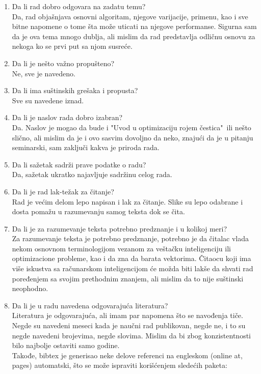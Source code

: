 \documentclass[a4paper]{report}
\begin{document}
\begin{enumerate}
\item Da li rad dobro odgovara na zadatu temu?\\
Da, rad objašnjava osnovni algoritam, njegove varijacije, primenu, kao i sve bitne napomene o tome šta može uticati na njegove performanse. Sigurna sam da je ova tema mnogo dublja, ali mislim da rad predstavlja odličnu osnovu za nekoga ko se prvi put sa njom susreće.

\item Da li je nešto važno propušteno?\\
Ne, sve je navedeno.

\item Da li ima suštinskih grešaka i propusta?\\
Sve su navedene iznad.

\item Da li je naslov rada dobro izabran?\\
Da. Naslov je mogao da bude i "Uvod u optimizaciju rojem čestica"\ ili nešto slično, ali mislim da je i ovo sasvim dovoljno da neko, znajući da je u pitanju seminarski, sam zaključi kakva je priroda rada.

\item Da li sažetak sadrži prave podatke o radu?\\
Da, sažetak ukratko najavljuje sadržinu celog rada.

\item Da li je rad lak-težak za čitanje?\\
Rad je većim delom lepo napisan i lak za čitanje. Slike su lepo odabrane i dosta pomažu u razumevanju samog teksta dok se čita.

\item Da li je za razumevanje teksta potrebno predznanje i u kolikoj meri?\\
Za razumevanje teksta je potrebno predznanje, potrebno je da čitalac vlada nekom osnovnom terminologijom vezanom za veštačku inteligenciju ili optimizacione probleme, kao i da zna da barata vektorima. Čitaocu koji ima više iskustva sa računarskom inteligencijom će možda biti lakše da shvati rad poređenjem sa svojim prethodnim znanjem, ali mislim da to nije suštinski neophodno.

\item Da li je u radu navedena odgovarajuća literatura?\\
Literatura je odgovarajuća, ali imam par napomena što se navođenja tiče.\\
Negde su navedeni meseci kada je naučni rad publikovan, negde ne, i to su negde navedeni brojevima, negde slovima. Mislim da bi zbog konzistentnosti bilo najbolje ostaviti samo godine.\\
Takođe, bibtex je generisao neke delove referenci na engleskom (online at, pages) automatski, što se može ispraviti korišćenjem sledećih paketa:


\end{enumerate}
\end{document}

